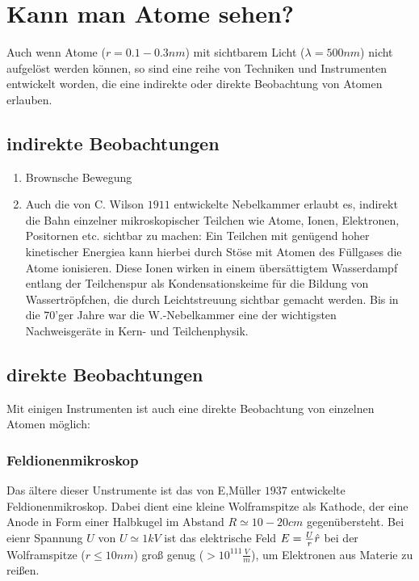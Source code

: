 \section{Kann man Atome sehen?} %
\label{sec:Kann man Atome sehen}
Auch wenn Atome ($r=0.1 - 0.3 nm$) mit sichtbarem Licht ($\lambda = 500nm$)
nicht aufgelöst werden können, so sind eine reihe von Techniken und
Instrumenten entwickelt worden, die eine indirekte oder direkte Beobachtung von
Atomen erlauben.
\subsection{indirekte Beobachtungen} %
\label{sub:indirekte_Beobachtungen}
\begin{enumerate}
    \item Brownsche Bewegung
    \item Auch die von C. Wilson $1911$ entwickelte Nebelkammer erlaubt es,
    indirekt die Bahn einzelner mikroskopischer Teilchen wie Atome, Ionen,
    Elektronen, Positornen etc. sichtbar zu machen: Ein Teilchen mit genügend
    hoher kinetischer Energiea kann hierbei durch Stöse mit Atomen des
    Füllgases die Atome ionisieren. Diese Ionen wirken in einem übersättigtem
    Wasserdampf entlang der Teilchenspur als Kondensationskeime für die Bildung
    von Wassertröpfchen, die durch Leichtstreuung sichtbar gemacht werden. Bis
    in die $70$'ger Jahre war die W.-Nebelkammer eine der wichtigsten
    Nachweisgeräte in Kern- und Teilchenphysik.
\end{enumerate}
\subsection{direkte Beobachtungen} %
\label{sub:direkte_Beobachtungen}
Mit einigen Instrumenten ist auch eine direkte Beobachtung von einzelnen Atomen
möglich:
\subsubsection{Feldionenmikroskop} %
\label{ssub:Feldionenmikroskop}
    Das ältere dieser Unstrumente ist das von E,Müller $1937$ entwickelte
    Feldionenmikroskop. Dabei dient eine kleine Wolframspitze als Kathode, der
    eine Anode in Form einer Halbkugel im Abstand $R \simeq 10-20cm$
    gegenübersteht. Bei eienr Spannung $U$ von $U \simeq 1kV$ ist das
    elektrische Feld $E = \frac{U}{r} \hat{r}$ bei der Wolframspitze ($r \leq
    10nm$) groß genug ($ > 10^{111} \frac{V}{m}$), um Elektronen aus Materie zu
    reißen.

